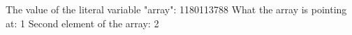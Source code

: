 The value of the literal variable "array": 1180113788
What the array is pointing at: 1
Second element of the array: 2
